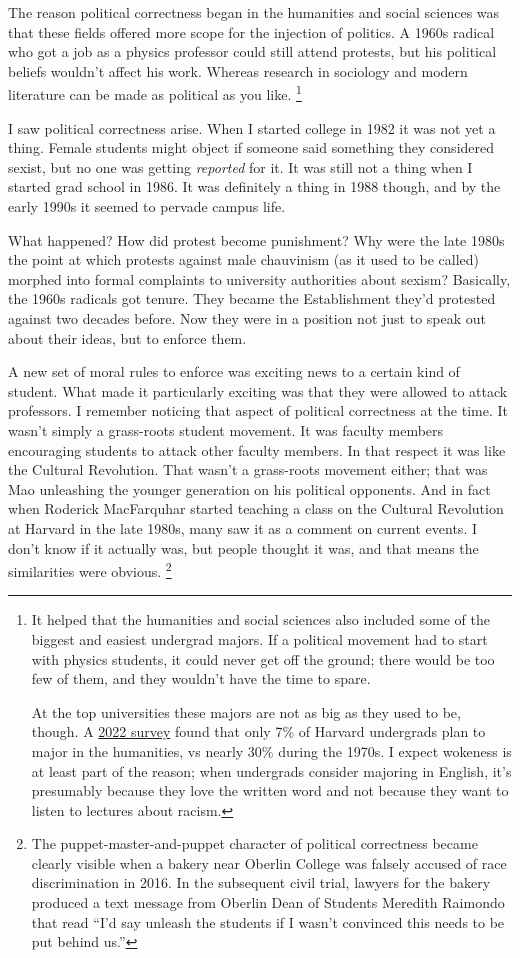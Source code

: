 \documentclass[12pt]{book}
\begin{document}
The reason political correctness began in the humanities and social
sciences was that these fields offered more scope for the injection of
politics. A 1960s radical who got a job as a physics professor could
still attend protests, but his political beliefs wouldn't affect his
work. Whereas research in sociology and modern literature can be made as
political as you like. \footnote{It helped that the humanities and social sciences also included
some of the biggest and easiest undergrad majors. If a political
movement had to start with physics students, it could never get off the
ground; there would be too few of them, and they wouldn't have the time
to spare.

At the top universities these majors are not as big as they used to be,
though. A
\href{https://www.newyorker.com/magazine/2023/03/06/the-end-of-the-english-major}{2022
survey} found that only 7\% of Harvard undergrads plan to major in the
humanities, vs nearly 30\% during the 1970s. I expect wokeness is at
least part of the reason; when undergrads consider majoring in English,
it's presumably because they love the written word and not because they
want to listen to lectures about racism.}

I saw political correctness arise. When I started college in 1982 it was
not yet a thing. Female students might object if someone said something
they considered sexist, but no one was getting \emph{reported} for it.
It was still not a thing when I started grad school in 1986. It was
definitely a thing in 1988 though, and by the early 1990s it seemed to
pervade campus life.

What happened? How did protest become punishment? Why were the late
1980s the point at which protests against male chauvinism (as it used to
be called) morphed into formal complaints to university authorities
about sexism? Basically, the 1960s radicals got tenure. They became the
Establishment they'd protested against two decades before. Now they were
in a position not just to speak out about their ideas, but to enforce
them.

A new set of moral rules to enforce was exciting news to a certain kind
of student. What made it particularly exciting was that they were
allowed to attack professors. I remember noticing that aspect of
political correctness at the time. It wasn't simply a grass-roots
student movement. It was faculty members encouraging students to attack
other faculty members. In that respect it was like the Cultural
Revolution. That wasn't a grass-roots movement either; that was Mao
unleashing the younger generation on his political opponents. And in
fact when Roderick MacFarquhar started teaching a class on the Cultural
Revolution at Harvard in the late 1980s, many saw it as a comment on
current events. I don't know if it actually was, but people thought it
was, and that means the similarities were obvious.
\footnote{The puppet-master-and-puppet character of political correctness
became clearly visible when a bakery near Oberlin College was falsely
accused of race discrimination in 2016. In the subsequent civil trial,
lawyers for the bakery produced a text message from Oberlin Dean of
Students Meredith Raimondo that read ``I'd say unleash the students if I
wasn't convinced this needs to be put behind us.''}
\end{document}
